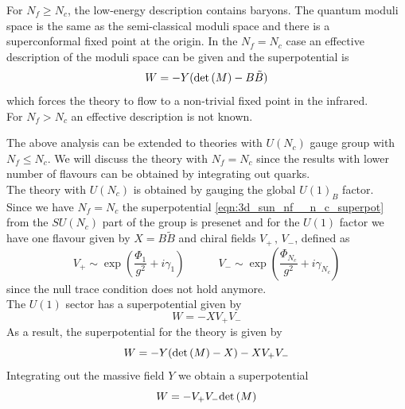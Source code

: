 For $N_f \geq N_c $, the low-energy description contains baryons.
The quantum moduli space is the same as the semi-classical moduli space and there is a superconformal fixed point at the origin.
In the $N_f = N_c$ case an effective description of the moduli space can be given and the superpotential is 
\begin{equation}
W = - Y ( \mathrm{det } \,{(M)} - B \tilde{B})
\label{eqn:3d_sun_nf__n_c_superpot}
\end{equation}
which forces the theory to flow to a non-trivial fixed point in the infrared.\\
For $N_f >N_c$ an effective description is not known.


The above analysis can be extended to theories with $U(N_c)$ gauge group with $N_f \leq N_c$.
We will discuss the theory with $N_f = N_c$ since the results with lower number of flavours can be obtained by integrating out quarks.\\
The theory with $U(N_c)$ is obtained by gauging the global $U(1)_B$ factor.\\
Since we have $N_f=N_c$ the superpotential \eqref{eqn:3d_sun_nf__n_c_superpot} from the $SU(N_c)$ part of the group is presenet  and for the $U(1)$ factor we have one flavour given by $X = B \tilde{B}$ 
and chiral fields $V_+ \, , \,V_-$, defined as 
\begin{equation}
V_+ \sim \exp{ \left(  \frac{\Phi_1}{g^2} + i \gamma_1 \right) } \qquad \quad V_- \sim \exp{ \left( \frac{\Phi_{N_c}}{g^2} + i \gamma_{N_c} \right) }
\end{equation}
since the null trace condition does not hold anymore.\\
 The $U(1)$ sector has a superpotential given by
 $$ W = - X V_+ V_-$$
As a result, the superpotential for the theory is given by
\begin{equation}
 W = - Y ( \mathrm{det } \,{(M)}  - X) - X V_+ V_- 
 \end{equation} 
Integrating out the massive field $Y$  we obtain a superpotential
\begin{equation}
W = -  V_+ V_-  \mathrm{det } \,{(M)}
\label{eqn:aharony_dual_description_NcNf}
\end{equation}



